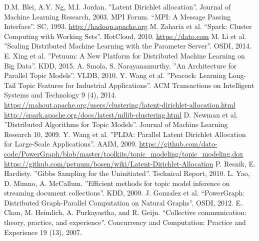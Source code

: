 \documentclass[conference]{IEEEtran}
\begin{document}
%
%
%
\begin{thebibliography}{99}
\setlength{\itemsep}{0pt}
\footnotesize
{}
D.M. Blei, A.Y. Ng, M.I. Jordan. ''Latent Dirichlet allocation''. Journal of Machine Learning Research, 2003.
MPI Forum. ``MPI: A Message Passing Interface''. SC, 1993.
\url{http://hadoop.apache.org}
M. Zaharia et al. ``Spark: Cluster Computing with Working Sets''. HotCloud, 2010.
\url{https://dato.com}
M. Li et al. ''Scaling Distributed Machine Learning with the Parameter Server''. OSDI, 2014.
E. Xing et al. ''Petuum: A New Platform for Distributed Machine Learning on Big Data''. KDD, 2015.
A. Smola, S. Narayanamurthy. ''An Architecture for Parallel Topic Models''. VLDB, 2010.
Y. Wang et al. ''Peacock: Learning Long-Tail Topic Features for Industrial Applications''.
ACM Transactions on Intelligent Systems and Technology 9 (4), 2014.
\url{https://mahout.apache.org/users/clustering/latent-dirichlet-allocation.html}
\url{http://spark.apache.org/docs/latest/mllib-clustering.html}
D. Newman et al. ''Distributed Algorithms for Topic Models''. Journal of Machine Learning Research 10, 2009.
Y. Wang et al. ''PLDA: Parallel Latent Dirichlet Allocation for Large-Scale Applications''. AAIM, 2009.
\url{https://github.com/dato-code/PowerGraph/blob/master/toolkits/topic_modeling/topic_modeling.dox}
\url{https://github.com/petuum/bosen/wiki/Latent-Dirichlet-Allocation}
P. Resnik, E. Hardisty. ''Gibbs Sampling for the Uninitiated''. Technical Report, 2010.
L. Yao, D. Mimno, A. McCallum. 
''Efficient methods for topic model inference on streaming document collections''. KDD, 2009.
J. Gonzalez et al. ``PowerGraph: Distributed Graph-Parallel Computation on Natural Graphs''. OSDI, 2012.
E. Chan, M. Heimlich, A. Purkayastha, and R. Geijn. ``Collective communication: theory, practice, and experience''. Concurrency and Computation: Practice and Experience 19 (13), 2007.

\end{thebibliography}
\end{document}
